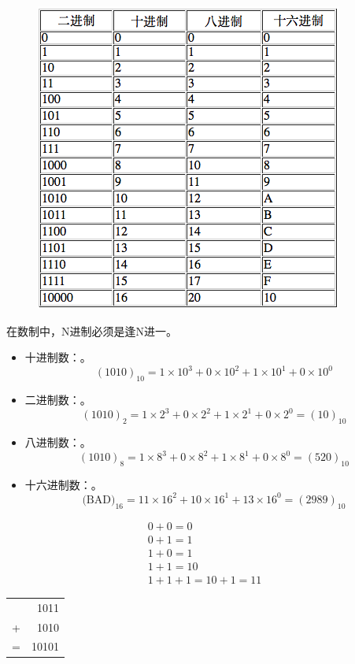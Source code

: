 \begin{frame}\ft{\secname}
\begin{figure}[h]
\centering
\includegraphics[width=3.in]{ch01/fig/shuzhi}
\end{figure}
\end{frame}

\begin{frame}
{在数制中，N进制必须是逢N进一。}

\begin{itemize}
\item 十进制数：。
\[
(1010)_{10}=1\times10^3+0\times10^2+1\times10^1+0\times10^0
\]
\item 二进制数：。
\[
(1010)_{2}=1\times2^3+0\times2^2+1\times2^1+0\times2^0=(10)_{10}
\]
\item 八进制数：。
\[
(1010)_{8}=1\times8^3+0\times8^2+1\times8^1+0\times8^0=(520)_{10}
\]
\item 十六进制数：。
\[
\mbox{(BAD)}_{16}=11\times16^2+10\times16^1+13\times16^0=(2989)_{10}
\]
\end{itemize}
\end{frame}

\begin{frame}

\[
\boxed{
\begin{array}{l}
0+0=0\\
0+1=1\\
1+0=1\\
1+1=10\\
1+1+1=10+1=11
\end{array}
}
\]

\begin{table}
\centering
\begin{tabular}{cD{.}{.}{3}}
&1011\\
+&1010\\
\hline
=&10101
\end{tabular}
\end{table}
\end{frame}

